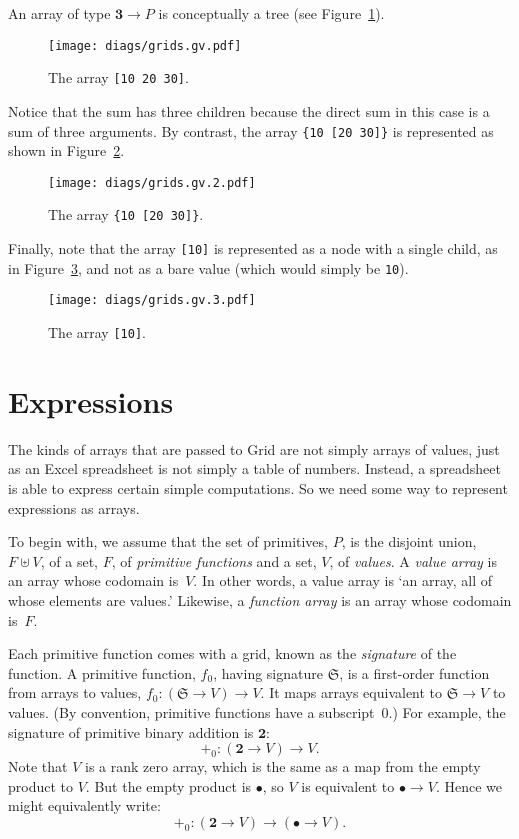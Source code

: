 \documentclass[11pt]{article}
\newcommand{\gr}[1]{\mathfrak{#1}}
\newcommand{\unit}{\bullet}
\newcommand{\three}{\mathbf{3}}
\begin{document}
An array of type $\three \to P$ is conceptually a tree (see Figure~\ref{fig:gridthree}).
\begin{figure}[ht]
  \texttt{[image: diags/grids.gv.pdf]}
  \caption{The array \texttt{[10 20 30]}.}\label{fig:gridthree}
\end{figure}
Notice that the sum has three children because the direct sum in this case is a sum of
three arguments. By contrast, the array \verb|{10 [20 30]}| is represented as
shown in Figure~\ref{fig:gridsum}.
\begin{figure}[ht]
  \texttt{[image: diags/grids.gv.2.pdf]}
  \caption{The array \texttt{\{10 [20 30]\}}.}\label{fig:gridsum}
\end{figure}
Finally, note that the array \verb|[10]| is represented as a node with a single
child, as in Figure~\ref{fig:gridsingleton}, and not as a bare value (which
would simply be \verb|10|).
\begin{figure}[ht]
  \texttt{[image: diags/grids.gv.3.pdf]}
  \caption{The array \texttt{[10]}.}\label{fig:gridsingleton}
\end{figure}


\section{Expressions}

The kinds of arrays that are passed to Grid are not simply arrays of values,
just as an Excel spreadsheet is not simply a table of numbers. Instead, a
spreadsheet is able to express certain simple computations. So we need some way
to represent expressions as arrays.

To begin with, we assume that the set of primitives, $P$, is the disjoint union,
$F \uplus V$, of a set, $F$, of \emph{primitive functions} and a set, $V$, of
\emph{values}. A \emph{value array} is an array whose codomain is~$V$. In other
words, a value array is `an array, all of whose elements are values.' Likewise,
a \emph{function array} is an array whose codomain is~$F$.

Each primitive function comes with a grid, known as the \emph{signature} of the
function. A primitive function, $f_0$, having signature $\gr{S}$, is a
first-order function from arrays to values, $f_0: (\gr{S} \to V) \to V$. It maps
arrays equivalent to $\gr{S}\to V$ to values. (By convention, primitive functions
have a subscript~0.) For example, the signature of primitive binary addition is
$\mathbf{2}$:
\begin{equation*}
+_0: (\mathbf{2} \to V) \to V.
\end{equation*}
Note that $V$ is a rank zero array, which is the same as a map from the empty
product to $V$. But the empty product is $\unit$, so $V$ is equivalent to
$\unit\to V$. Hence we might equivalently write:
\begin{equation*}
+_0: (\mathbf{2} \to V) \to (\unit \to V).
\end{equation*}
\end{document}
